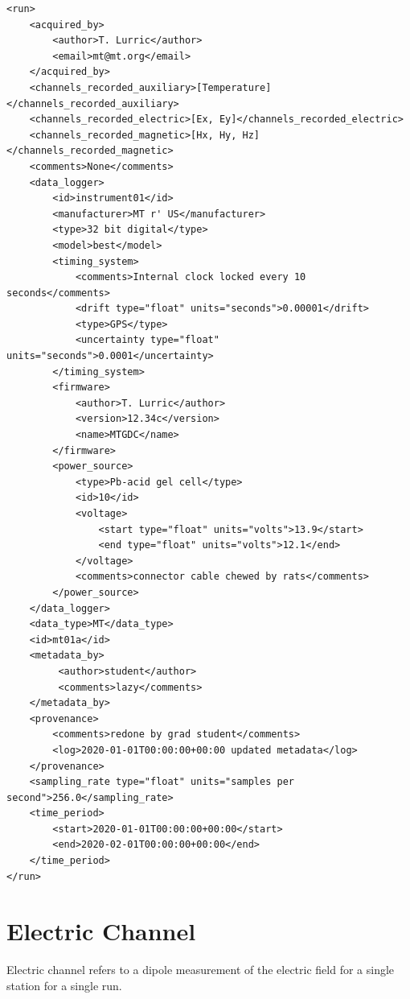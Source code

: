 \documentclass{article}
\begin{document}
\begin{verbatim}
<run>
    <acquired_by>
        <author>T. Lurric</author>
        <email>mt@mt.org</email>
    </acquired_by>
    <channels_recorded_auxiliary>[Temperature]</channels_recorded_auxiliary>
    <channels_recorded_electric>[Ex, Ey]</channels_recorded_electric>
    <channels_recorded_magnetic>[Hx, Hy, Hz]</channels_recorded_magnetic>
    <comments>None</comments>
    <data_logger>
        <id>instrument01</id>
        <manufacturer>MT r' US</manufacturer>
        <type>32 bit digital</type>
        <model>best</model>
        <timing_system>
            <comments>Internal clock locked every 10 seconds</comments>
            <drift type="float" units="seconds">0.00001</drift>
            <type>GPS</type>
            <uncertainty type="float" units="seconds">0.0001</uncertainty>
        </timing_system>
        <firmware>
            <author>T. Lurric</author>
            <version>12.34c</version>
            <name>MTGDC</name>
        </firmware>
        <power_source>
            <type>Pb-acid gel cell</type>
            <id>10</id>
            <voltage>
                <start type="float" units="volts">13.9</start>
                <end type="float" units="volts">12.1</end>
            </voltage>
            <comments>connector cable chewed by rats</comments>
        </power_source>
    </data_logger>
    <data_type>MT</data_type>
    <id>mt01a</id>
    <metadata_by>
         <author>student</author>
         <comments>lazy</comments>
    </metadata_by>
    <provenance>
        <comments>redone by grad student</comments>
        <log>2020-01-01T00:00:00+00:00 updated metadata</log>
    </provenance>
    <sampling_rate type="float" units="samples per second">256.0</sampling_rate>
    <time_period>
        <start>2020-01-01T00:00:00+00:00</start>
        <end>2020-02-01T00:00:00+00:00</end>
    </time_period>
</run>
\end{verbatim}

\newpage
\section{Electric Channel}

Electric channel refers to a dipole measurement of the electric field for a single station for a single run.   
 
\end{document}
